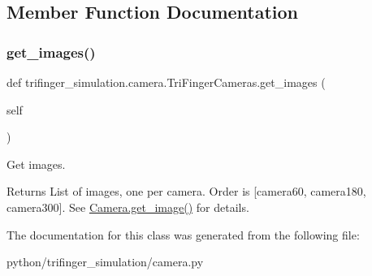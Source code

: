 \subsection{Member Function Documentation}
\mbox{\label{classtrifinger__simulation_1_1camera_1_1TriFingerCameras_ab87b4d284e9a42deebe874ad5fb233b9}} 
\subsubsection{\texorpdfstring{get\+\_\+images()}{get\_images()}}
{\footnotesize\ttfamily def trifinger\+\_\+simulation.\+camera.\+Tri\+Finger\+Cameras.\+get\+\_\+images (\begin{DoxyParamCaption}\item[{}]{self }\end{DoxyParamCaption})}



Get images. 

\begin{DoxyReturn}{Returns}
List of images, one per camera. Order is \mbox{[}camera60, camera180, camera300\mbox{]}. See \hyperlink{classtrifinger__simulation_1_1camera_1_1Camera_a6055089009e1f63df5ced179e5c56254}{Camera.\+get\+\_\+image()} for details. 
\end{DoxyReturn}


The documentation for this class was generated from the following file\+:\begin{DoxyCompactItemize}
\item 
python/trifinger\+\_\+simulation/camera.\+py\end{DoxyCompactItemize}
